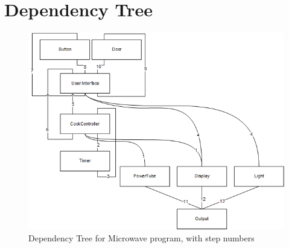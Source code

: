 \section{Dependency Tree}
\begin{figure}[H]
	\centering
	\includegraphics[width=1\linewidth]{"../Diagrams/DependencyTree_Microwave - Updatet - Numbered"}
	\caption{Dependency Tree for Microwave program, with step numbers}
	\label{fig:dependencytreemicrowave}
\end{figure}